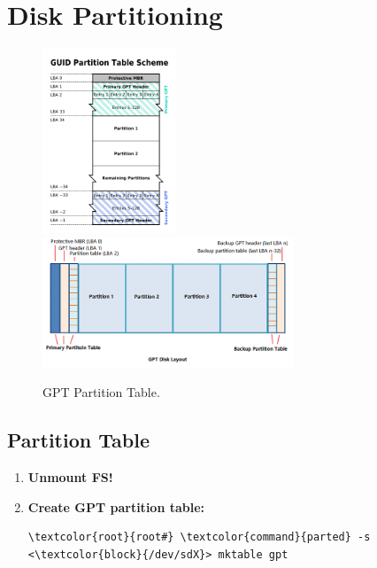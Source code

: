 \documentclass[10pt, a4paper, onecolumn, oneside, titlepage, openany]{book}
\begin{document}
\section{Disk Partitioning}
\begin{figure}[ht]
    \begin{center}
        \includegraphics[width=40mm]{./src/img/gpt1.png}
        \includegraphics[width=75mm]{./src/img/gpt2.png}
        \caption{GPT Partition Table.}
        \label{fig:1}
    \end{center}
\end{figure}
\subsection{Partition Table}
\begin{enumerate}
    \item \textbf{Unmount FS!}
    \item \textbf{Create GPT partition table:}
\begin{Verbatim}[commandchars=\\\{\}]
\textcolor{root}{root#} \textcolor{command}{parted} -s <\textcolor{block}{/dev/sdX}> mktable gpt
\end{Verbatim}
\end{enumerate}
\end{document}
